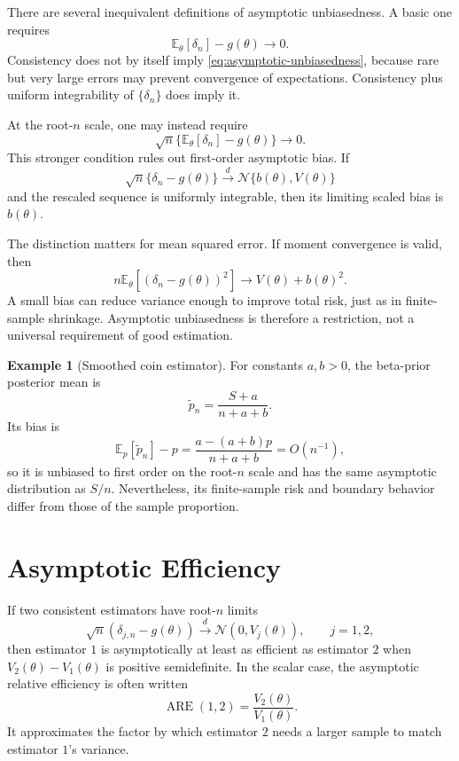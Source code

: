 \documentclass[12pt,oneside]{book}
\numberwithin{equation}{section}
\theoremstyle{definition}
\newtheorem{example}{Example}[section]
\theoremstyle{plain}
\theoremstyle{remark}
\newcommand{\E}{\mathbb{E}}
\newcommand{\convd}{\overset{d}{\to}}
\newcommand{\Normal}{\mathcal{N}}
\begin{document}
There are several inequivalent definitions of asymptotic unbiasedness.  A
basic one requires
\begin{equation}
    \E_\theta[\delta_n]-g(\theta)\longrightarrow0.
    \label{eq:asymptotic-unbiasedness}
\end{equation}
Consistency does not by itself imply \eqref{eq:asymptotic-unbiasedness},
because rare but very large errors may prevent convergence of expectations.
Consistency plus uniform integrability of $\{\delta_n\}$ does imply it.

At the root-$n$ scale, one may instead require
\[
    \sqrt n\{\E_\theta[\delta_n]-g(\theta)\}\longrightarrow0.
\]
This stronger condition rules out first-order asymptotic bias.  If
\[
    \sqrt n\{\delta_n-g(\theta)\}
    \convd\Normal\{b(\theta),V(\theta)\}
\]
and the rescaled sequence is uniformly integrable, then its limiting scaled
bias is $b(\theta)$.

The distinction matters for mean squared error.  If moment convergence is
valid, then
\begin{equation}
 n\E_\theta[(\delta_n-g(\theta))^2]
 \longrightarrow V(\theta)+b(\theta)^2.
 \label{eq:asymptotic-mse}
\end{equation}
A small bias can reduce variance enough to improve total risk, just as in
finite-sample shrinkage.  Asymptotic unbiasedness is therefore a restriction,
not a universal requirement of good estimation.

\begin{example}[Smoothed coin estimator]
For constants $a,b>0$, the beta-prior posterior mean is
\[
    \widetilde p_n=\frac{S+a}{n+a+b}.
\]
Its bias is
\[
    \E_p[\widetilde p_n]-p
    =\frac{a-(a+b)p}{n+a+b}=O(n^{-1}),
\]
so it is unbiased to first order on the root-$n$ scale and has the same
asymptotic distribution as $S/n$.  Nevertheless, its finite-sample risk and
boundary behavior differ from those of the sample proportion.
\end{example}

\section{Asymptotic Efficiency}

If two consistent estimators have root-$n$ limits
\[
 \sqrt n(\delta_{j,n}-g(\theta))
 \convd\Normal(0,V_j(\theta)),\qquad j=1,2,
\]
then estimator $1$ is asymptotically at least as efficient as estimator $2$
when $V_2(\theta)-V_1(\theta)$ is positive semidefinite.  In the scalar case,
the asymptotic relative efficiency is often written
\[
    \operatorname{ARE}(1,2)=\frac{V_2(\theta)}{V_1(\theta)}.
\]
It approximates the factor by which estimator $2$ needs a larger sample to
match estimator $1$'s variance.
\end{document}
